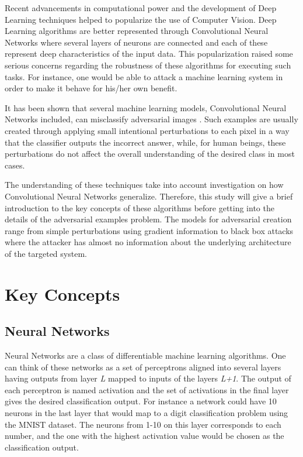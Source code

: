 \documentclass{article}
\begin{document}
Recent advancements in computational power and the development of Deep Learning techniques helped to popularize the use of Computer Vision. Deep Learning algorithms are better represented through Convolutional Neural Networks where several layers of neurons are connected and each of these represent deep characteristics of the input data. This popularization raised some serious concerns regarding the robustness of these algorithms for executing such tasks. For instance, one would be able to attack a machine learning system in order to make it behave for his/her own benefit.

It has been shown that several machine learning models, Convolutional Neural Networks included, can misclassify adversarial images \cite{goodfellow2014}\cite{papernot2016transf}\cite{goodfellow2016}\cite{szegedy2013}. Such examples are usually created through applying small intentional perturbations to each pixel in a way that the classifier outputs the incorrect answer, while, for human beings, these perturbations do not affect the overall understanding of the desired class in most cases.

The understanding of these techniques take into account investigation on how Convolutional Neural Networks generalize. Therefore, this study will give a brief introduction to the key concepts of these algorithms before getting into the details of the adversarial examples problem. The models for adversarial creation range from simple perturbations using gradient information to black box attacks where the attacker has almost no information about the underlying architecture of the targeted system.

\section{Key Concepts}\label{sec:key_concepts}

\subsection{Neural Networks}\label{subsec:neural_deep}

Neural Networks are a class of differentiable machine learning algorithms. One can think of these networks as a set of perceptrons aligned into several layers having outputs from layer \textit{L} mapped to inputs of the layers \textit{L+1}. The output of each perceptron is named activation and the set of activations in the final layer gives the desired classification output. For instance a network could have 10 neurons in the last layer that would map to a digit classification problem using the MNIST \cite{lecun1998mnist} dataset. The neurons from 1-10 on this layer corresponds to each number, and the one with the highest activation value would be chosen as the classification output.
\end{document}

